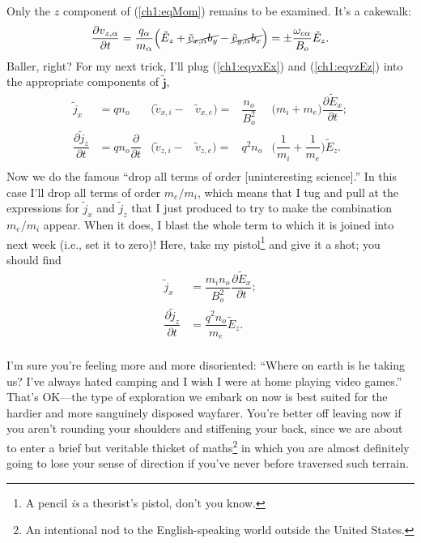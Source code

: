 Only the $z$ component of (\ref{ch1:eqMom}) remains to be examined. It's a cakewalk:
\begin{equation} \label{ch1:eqvzEz} \dfrac{\partial v_{z,\alpha}}{\partial t} =
  \dfrac{q_\alpha}{m_\alpha} \Big ( \tilde E_z + \cancel{\tilde v_{x,\alpha} b_y} -
  \cancel{\tilde v_{y,\alpha} b_x} \Big ) = \pm \dfrac{\omega_{c \alpha}}{B_o} \tilde E_z.
\end{equation}
Baller, right? For my next trick, I'll plug (\ref{ch1:eqvxEx}) and
(\ref{ch1:eqvzEz}) into the appropriate components of $\mathbf{\tilde j}$,
\begin{equation*} 
  \begin{alignedat}{4}
    \tilde j_x                              &= q n_o &\Big ( \tilde v_{x,i} - & \tilde v_{x,e} \Big ) = & \dfrac{n_o}{B_o^2} &\Big( m_i + m_e \Big) \dfrac{\partial \tilde E_x}{\partial t}; \\
    \dfrac{\partial \tilde j_z}{\partial t} &= q n_o \dfrac{\partial}{\partial t} &\Big ( \tilde v_{z,i} - & \tilde v_{z,e} \Big ) =& q^2 n_o &\Big( \dfrac{1}{m_i} + \dfrac{1}{m_e} \Big) \tilde E_z. \\
  \end{alignedat}
\end{equation*}
Now we do the famous ``drop all terms of order [uninteresting science].'' In
this case I'll drop all terms of order $m_e/m_i$, which means that I tug and
pull at the expressions for $\tilde j_x$ and $\tilde j_z$ that I just produced
to try to make the combination $m_e/m_i$ appear. When it does, I blast the whole
term to which it is joined into next week (i.e., set it to zero)! Here, take my
pistol\footnote{A pencil \emph{is} a theorist's pistol, don't you know.} and
give it a shot; you should find
\begin{equation} \label{ch1:eqDaddy}
  \begin{alignedat}{4}
    \tilde j_x                              &= \dfrac{m_i n_o }{B_o^2} \dfrac{\partial \tilde E_x}{\partial t}; \\
    \dfrac{\partial \tilde j_z}{\partial t} &= \dfrac{q^2 n_o }{m_e} \tilde E_z. \\
  \end{alignedat}
\end{equation}

I'm sure you're feeling more and more disoriented: ``Where on earth is he taking
us? I've always hated camping and I wish I were at home playing video games.''
That's OK---the type of exploration we embark on now is best suited for the
hardier and more sanguinely disposed wayfarer. You're better off leaving now if
you aren't rounding your shoulders and stiffening your back, since we are about
to enter a brief but veritable thicket of maths\footnote{An intentional nod to
  the English-speaking world outside the United States.} in which you are almost
definitely going to lose your sense of direction if you've never before
traversed such terrain.

